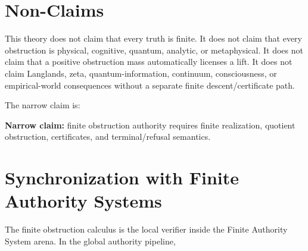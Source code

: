 \documentclass[11pt]{article}
\theoremstyle{definition}
\begin{document}
\begin{abstract}
We formalize a finite obstruction-repair calculus for contextual symbolic systems. A level is a finite tuple

\[
\mathcal M=(\mathcal T,\mathcal C,\rho,C^\bullet,\omega,p)
\]

where \(\mathcal T\) and \(\mathcal C\) are finite categories, \(\rho:\mathcal C\to\mathrm{End}(\mathcal T)\) is a context action, and

\[
C^0\xrightarrow{d_0}C^1\xrightarrow{d_1}C^2,
\qquad d_1d_0=0
\]

is a finite cochain complex. Exact repairs form \(B^1=\operatorname{im}(d_0)\); quotient obstruction is

\[
Q^1=C^1/B^1;
\]

and closed residual obstruction is

\[
H^1=\ker(\bar d_1)\cong\ker(d_1)/\operatorname{im}(d_0).
\]

A declared finite gauge gives a quotient obstruction magnitude \(\Phi\). Context-visible non-congruence supplies the lift trigger. Licensed lifts require explicit witness, resolver, minimality, preservation, and no-silent-mutation certificates.
\end{abstract}

\section*{Non-Claims}

This theory does not claim that every truth is finite. It does not claim that every obstruction is physical, cognitive, quantum, analytic, or metaphysical. It does not claim that a positive obstruction mass automatically licenses a lift. It does not claim Langlands, zeta, quantum-information, continuum, consciousness, or empirical-world consequences without a separate finite descent/certificate path.

The narrow claim is:

\textbf{Narrow claim:} finite obstruction authority requires finite realization, quotient obstruction, certificates, and terminal/refusal semantics.

\section{Synchronization with Finite Authority Systems}

The finite obstruction calculus is the local verifier inside the Finite Authority System arena. In the global authority pipeline,
\end{document}
